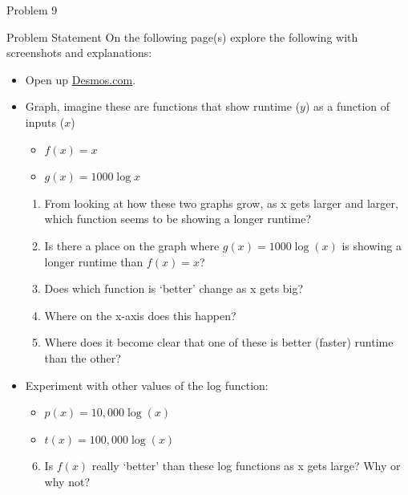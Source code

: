 \begin{problem}{Problem 9}
    \begin{statement}{Problem Statement}
        On the following page(s) explore the following with screenshots and explanations:

        \begin{itemize}
            \item Open up \href{https://www.desmos.com/}{Desmos.com}.
            \item Graph, imagine these are functions that show runtime ($y$) as a function of inputs ($x$)
            \begin{itemize}
                \item $f(x) = x$
                \item $g(x) = 1000 \log{x}$
            \end{itemize}
            \begin{enumerate}[label=(\alph*)]
                \item From looking at how these two graphs grow, as x gets larger and larger, which function seems to be showing a longer runtime?
                \item Is there a place on the graph where $g(x) = 1000 \log{(x)}$ is showing a longer runtime than $f(x) = x$?
                \item Does which function is `better' change as x gets big?
                \item Where on the x-axis does this happen?
                \item Where does it become clear that one of these is better (faster) runtime than the other?
            \end{enumerate}
            \item Experiment with other values of the log function:
            \begin{itemize}
                \item $p(x) = 10,000 \log{(x)}$
                \item $t(x) = 100,000 \log{(x)}$
            \end{itemize}
            \begin{enumerate}[label=(\alph*)]
                \setcounter{enumi}{5}
                \item Is $f(x)$ really `better' than these log functions as x gets large? Why or why not?
            \end{enumerate}
        \end{itemize}
    \end{statement}


\end{problem}
